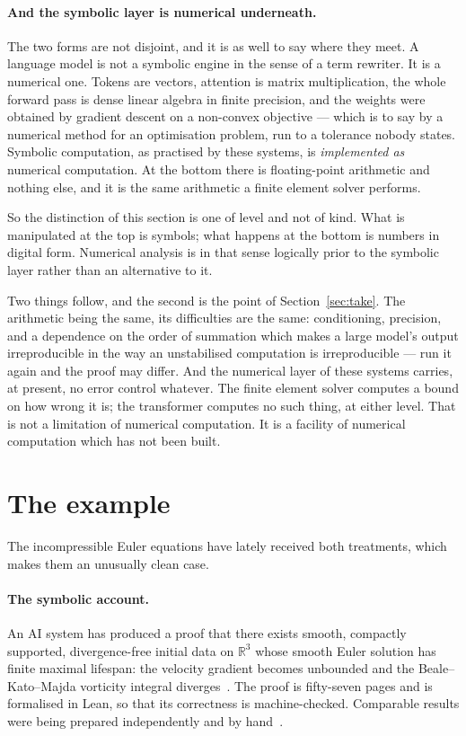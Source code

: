 \documentclass[11pt]{article}
\begin{document}
\paragraph{And the symbolic layer is numerical underneath.} The two forms are not disjoint, and it
is as well to say where they meet. A language model is not a symbolic engine in the sense of a term
rewriter. It is a numerical one. Tokens are vectors, attention is matrix multiplication, the whole
forward pass is dense linear algebra in finite precision, and the weights were obtained by gradient
descent on a non-convex objective --- which is to say by a numerical method for an optimisation
problem, run to a tolerance nobody states. Symbolic computation, as practised by these systems, is
\emph{implemented as} numerical computation. At the bottom there is floating-point arithmetic and
nothing else, and it is the same arithmetic a finite element solver performs.

So the distinction of this section is one of level and not of kind. What is manipulated at the top is
symbols; what happens at the bottom is numbers in digital form. Numerical analysis is in that sense
logically prior to the symbolic layer rather than an alternative to it.

Two things follow, and the second is the point of Section~\ref{sec:take}. The arithmetic being the
same, its difficulties are the same: conditioning, precision, and a dependence on the order of
summation which makes a large model's output irreproducible in the way an unstabilised computation is
irreproducible --- run it again and the proof may differ. And the numerical layer of these systems
carries, at present, no error control whatever. The finite element solver computes a bound on how
wrong it is; the transformer computes no such thing, at either level. That is not a limitation of
numerical computation. It is a facility of numerical computation which has not been built.

\section{The example}\label{sec:example}

The incompressible Euler equations have lately received both treatments, which makes them an unusually
clean case.

\paragraph{The symbolic account.} An AI system has produced a proof that there exists smooth,
compactly supported, divergence-free initial data on $\mathbb{R}^3$ whose smooth Euler solution has
finite maximal lifespan: the velocity gradient becomes unbounded and the Beale--Kato--Majda vorticity
integral diverges~\cite{openaieuler}. The proof is fifty-seven pages and is formalised in Lean, so
that its correctness is machine-checked. Comparable results were being prepared independently and by
hand~\cite{buckmaster}.
\end{document}
